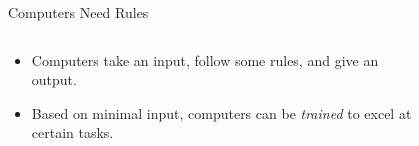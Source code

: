 \documentclass[10pt]{beamer}
\begin{document}
\begin{frame}{Computers Need Rules}

\begin{columns}	
	\begin{column}{0.5\textwidth}
		\begin{itemize}[<+->]
			\item Computers take an input, follow some rules, and give an output.
			\item Based on minimal input, computers can be \textit{trained} to excel at certain tasks.
		\end{itemize}
	\end{column}
	\begin{column}{0.5\textwidth}
		\begin{figure}[h]		
			\centering
		\end{figure}
	\end{column}
\end{columns}

\end{frame}
\end{document}
